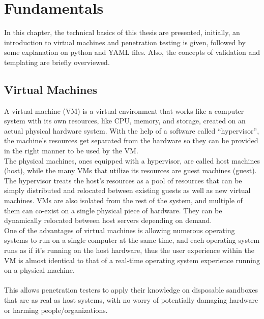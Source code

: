 \chapter{Fundamentals}
In this chapter, the technical basics of this thesis are presented, initially, an introduction to virtual machines and penetration testing is given, followed by some explanation on python and YAML files. Also, the concepts of validation and templating are briefly overviewed.

\section{Virtual Machines}
A virtual machine (VM) is a virtual environment that works like a computer system with its own resources, like CPU, memory, and storage, created on an actual physical hardware system. With the help of a software called  “hypervisor”, the machine’s resources get separated from the hardware so they can be provided in the right manner to be used by the VM.\\
The physical machines, ones equipped with a hypervisor, are called host machines (host), while the many VMs that utilize its resources are guest machines (guest). The hypervisor treats the host’s resources as a pool of resources that can be simply distributed and relocated between existing guests as well as new virtual machines. VMs are also isolated from the rest of the system, and multiple of them can co-exist on a single physical piece of hardware. They can be dynamically relocated between host servers depending on demand.\\
One of the advantages of virtual machines is allowing numerous operating systems to run on a single computer at the same time, and each operating system runs as if it’s running on the host hardware, thus the user experience within the VM is almost identical to that of a real-time operating system experience running on a physical machine\cite{vm_redhat}.\\
\\
This allows penetration testers to apply their knowledge on disposable sandboxes that are as real as host systems, with no worry of potentially damaging hardware or harming people/organizations.


